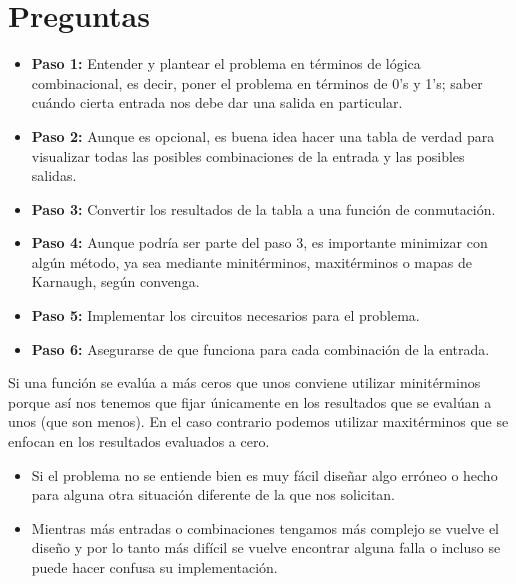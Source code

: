 \documentclass[answers]{exam}
\begin{document}
\section{Preguntas}
\begin{questions}
  \begin{solution}
    \begin{itemize}
      \item \textbf{Paso 1:} Entender y plantear el problema en términos de
            lógica combinacional, es decir, poner el problema en términos de 0's
            y 1's; saber cuándo cierta entrada nos debe dar una salida en
            particular.
      \item \textbf{Paso 2:} Aunque es opcional, es buena idea hacer una tabla
            de verdad para visualizar todas las posibles combinaciones de la
            entrada y las posibles salidas.
      \item \textbf{Paso 3:} Convertir los resultados de la tabla a una función
            de conmutación.
      \item \textbf{Paso 4:} Aunque podría ser parte del paso 3, es importante
            minimizar con algún método, ya sea mediante minitérminos,
            maxitérminos o mapas de Karnaugh, según convenga.
      \item \textbf{Paso 5:} Implementar los circuitos necesarios para el
            problema.
      \item \textbf{Paso 6:} Asegurarse de que funciona para cada
            combinación de la entrada.
    \end{itemize}
  \end{solution}

  \begin{solution}
    Si una función se evalúa a más ceros que unos conviene utilizar minitérminos
    porque así nos tenemos que fijar únicamente en los resultados que se evalúan
    a unos (que son menos). En el caso contrario podemos utilizar maxitérminos
    que se enfocan en los resultados evaluados a cero.
  \end{solution}

  \begin{solution}
    \begin{itemize}
      \item Si el problema no se entiende bien es muy fácil diseñar algo erróneo
            o hecho para alguna otra situación diferente de la que nos
            solicitan.
      \item Mientras más entradas o combinaciones tengamos más complejo se
            vuelve el diseño y por lo tanto más difícil se vuelve encontrar
            alguna falla o incluso se puede hacer confusa su implementación.
    \end{itemize}
  \end{solution}
\end{questions}
\end{document}
